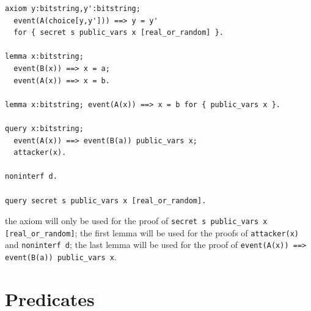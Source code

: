 \documentclass{book}
\begin{document}
\begin{lstlisting}
axiom y:bitstring,y':bitstring;
  event(A(choice[y,y'])) ==> y = y'
  for { secret s public_vars x [real_or_random] }.

lemma x:bitstring;
  event(B(x)) ==> x = a;
  event(A(x)) ==> x = b.

lemma x:bitstring; event(A(x)) ==> x = b for { public_vars x }.

query x:bitstring;
  event(A(x)) ==> event(B(a)) public_vars x;
  attacker(x).

noninterf d.

query secret s public_vars x [real_or_random].
\end{lstlisting}
the axiom will only be used for the proof of \lstinline!secret s public_vars x [real_or_random]!; the first lemma will be used for the proofs of \lstinline!attacker(x)! and \lstinline!noninterf d!; the last lemma will be used for the proof of \lstinline!event(A(x)) ==> event(B(a)) public_vars x!.

\section{Predicates}\label{sec:predicates}
\end{document}
